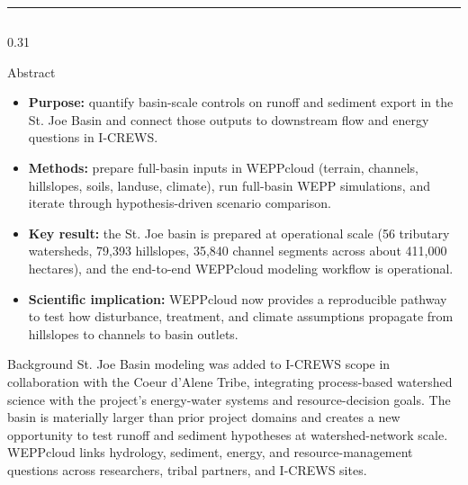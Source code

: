 \documentclass[final]{beamer}
\newlength{\bodyH}\setlength{\bodyH}{69cm}
\newcommand{\goldrule}{\textcolor{uidahogold}{\rule{\linewidth}{7pt}}}
\newenvironment{pitem}
  {\begin{itemize}\setlength{\itemsep}{0.3em}\setlength{\parskip}{0pt}}
  {\end{itemize}}
\newcommand{\lead}[1]{\textbf{\color{icrewsnavy}#1}}
\begin{document}
\begin{frame}[t]
\vspace{6pt}
\goldrule
\vspace{12pt}

\begin{columns}[t]

\begin{column}{0.31\textwidth}
\begin{minipage}[t][\bodyH][t]{\linewidth}

  \begin{block}{Abstract}
    \begin{pitem}
      \item \lead{Purpose:} quantify basin-scale controls on runoff and
        sediment export in the St. Joe Basin and connect those outputs to
        downstream flow and energy questions in I-CREWS.
      \item \lead{Methods:} prepare full-basin inputs in WEPPcloud
        (terrain, channels, hillslopes, soils, landuse, climate), run
        full-basin WEPP simulations, and iterate through
        hypothesis-driven scenario comparison.
      \item \lead{Key result:} the St. Joe basin is prepared at
        operational scale (56 tributary watersheds, 79,393 hillslopes,
        35,840 channel segments across about 411,000 hectares), and the
        end-to-end WEPPcloud modeling workflow is operational.
      \item \lead{Scientific implication:} WEPPcloud now provides a
        reproducible pathway to test how disturbance, treatment, and
        climate assumptions propagate from hillslopes to channels to
        basin outlets.
    \end{pitem}
  \end{block}

  \vfill

  \begin{block}{Background}
    St. Joe Basin modeling was added to I-CREWS scope in collaboration
    with the Coeur d'Alene Tribe, integrating process-based watershed
    science with the project's energy-water systems and resource-decision
    goals. The basin is materially larger than prior project domains and
    creates a new opportunity to test runoff and sediment hypotheses at
    watershed-network scale. WEPPcloud links hydrology, sediment, energy,
    and resource-management questions across researchers, tribal
    partners, and I-CREWS sites.
  \end{block}


\end{minipage}
\end{column}
\end{columns}
\end{frame}
\end{document}
